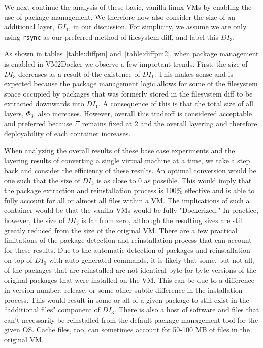We next continue the analysis of these basic, vanilla linux VMs by enabling the use of package management. We therefore now also consider the size of an additional layer, $DI_1$, in our discussion. For simplicity, we assume we are only using \texttt{rsync} as our preferred method of filesystem diff, and label this $DI_3$.

As shown in tables~\ref{table:diffpm} and~\ref{table:diffpm2}, when package management is enabled in VM2Docker we observe a few important trends. First, the size of $DI_3$ decreases as a result of the existence of $DI_1$. This makes sense and is expected because the package management logic allows for some of the filesystem space occupied by packages that was formerly stored in the filesystem diff to be extracted downwards into $DI_1$. A consequence of this is that the total size of all layers, $\Phi_3$, also increases. However, overall this tradeoff is considered acceptable and preferred because $\Xi$ remains fixed at 2 and the overall layering and therefore deployability of each container increases.

When analyzing the overall results of these base case experiments and the layering results of converting a single virtual machine at a time, we take a step back and consider the efficiency of these results. An optimal conversion would be one such that the size of $DI_3$ is as close to 0 as possible. This would imply that the package extraction and reinstallation process is 100\% effective and is able to fully account for all or almost all files within a VM. The implications of such a container would be that the vanilla VMs would be fully "Dockerized." In practice, however, the size of $DI_3$ is far from zero, although the resulting sizes are still greatly reduced from the size of the original VM. There are a few practical limitations of the package detection and reinstallation process that can account for these results. Due to the automatic detection of packages and reinstallation on top of $DI_0$ with auto-generated commands, it is likely that some, but not all, of the packages that are reinstalled are not identical byte-for-byte versions of the original packages that were installed on the VM. This can be due to a difference in version number, release, or some other subtle difference in the installation process. This would result in some or all of a given package to still exist in the ``additional files" component of $DI_3$. There is also a host of software and files that can't necessarily be reinstalled from the default package management tool for the given OS. Cache files, too, can sometimes account for 50-100 MB of files in the original VM.

